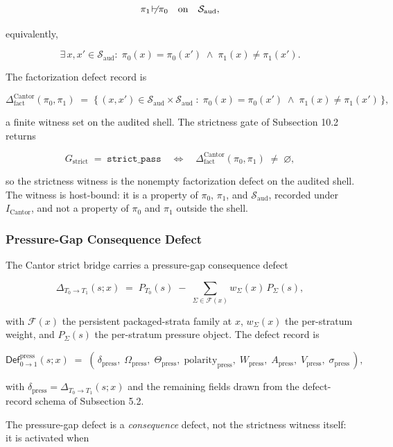 \documentclass[11pt]{article}
\providecommand{\factor}{\mathrel{\!\vdash\!}}
\theoremstyle{definition}
\begin{document}
\[
\pi_1\not\factor\pi_0\quad\text{on}\quad\mathcal S_{\mathrm{aud}},
\]

equivalently,

\[
\exists\,x,x'\in\mathcal S_{\mathrm{aud}}:\;\pi_0(x)=\pi_0(x')\;\land\;\pi_1(x)\neq\pi_1(x').
\]

The factorization defect record is

\[
\Delta_{\mathrm{fact}}^{\mathrm{Cantor}}(\pi_0,\pi_1)\;=\;\bigl\{\,(x,x')\in\mathcal S_{\mathrm{aud}}\times\mathcal S_{\mathrm{aud}}\;:\;\pi_0(x)=\pi_0(x')\;\land\;\pi_1(x)\neq\pi_1(x')\,\bigr\},
\]

a finite witness set on the audited shell. The strictness gate of Subsection 10.2 returns

\[
G_{\mathrm{strict}}\;=\;\texttt{strict\_pass}\quad\Longleftrightarrow\quad\Delta_{\mathrm{fact}}^{\mathrm{Cantor}}(\pi_0,\pi_1)\;\neq\;\varnothing,
\]

so the strictness witness is the nonempty factorization defect on the audited shell. The witness is host-bound: it is a property of \(\pi_0\), \(\pi_1\), and \(\mathcal S_{\mathrm{aud}}\), recorded under \(I_{\mathrm{Cantor}}\), and not a property of \(\pi_0\) and \(\pi_1\) outside the shell.

\subsubsection{Pressure-Gap Consequence Defect}

The Cantor strict bridge carries a pressure-gap consequence defect

\[
\Delta_{T_0\to T_1}(s;x)\;=\;P_{T_0}(s)\;-\;\sum_{\Sigma\in\mathcal F(x)}w_{\Sigma}(x)\,P_{\Sigma}(s),
\]

with \(\mathcal F(x)\) the persistent packaged-strata family at \(x\), \(w_{\Sigma}(x)\) the per-stratum weight, and \(P_{\Sigma}(s)\) the per-stratum pressure object. The defect record is

\[
\mathsf{Def}^{\mathrm{press}}_{0\to 1}(s;x)\;=\;(\,\delta_{\mathrm{press}},\;\Omega_{\mathrm{press}},\;\Theta_{\mathrm{press}},\;\mathrm{polarity}_{\mathrm{press}},\;W_{\mathrm{press}},\;A_{\mathrm{press}},\;V_{\mathrm{press}},\;\sigma_{\mathrm{press}}\,),
\]

with \(\delta_{\mathrm{press}}=\Delta_{T_0\to T_1}(s;x)\) and the remaining fields drawn from the defect-record schema of Subsection 5.2.

The pressure-gap defect is a \emph{consequence} defect, not the strictness witness itself: it is activated when
\end{document}
